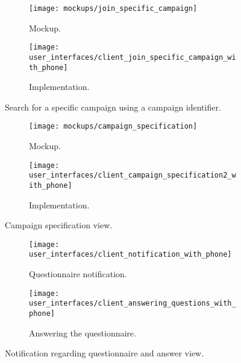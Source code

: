 \begin{figure}
\begin{subfigure}[!t]{.48\textwidth}
  \centering
  \texttt{[image: mockups/join\_specific\_campaign]}
  \caption{Mockup.}
  \label{fig:mockup_specific_campaign}
\end{subfigure}%
\begin{subfigure}[!t]{.52\textwidth}
  \centering
  \texttt{[image: user\_interfaces/client\_join\_specific\_campaign\_with\_phone]}
  \caption{Implementation.}
  \label{fig:implementation_specific_campaign}
\end{subfigure}
\caption{Search for a specific campaign using a campaign identifier.}
\label{fig:specific_campaign}
\end{figure}
\FloatBarrier

\begin{figure}
\begin{subfigure}[!t]{.48\textwidth}
  \centering
  \texttt{[image: mockups/campaign\_specification]}
  \caption{Mockup.}
  \label{fig:mockup_campaign_specification}
\end{subfigure}%
\begin{subfigure}[!t]{.52\textwidth}
  \centering
  \texttt{[image: user\_interfaces/client\_campaign\_specification2\_with\_phone]}
  \caption{Implementation.}
  \label{fig:implementation_campaign_specification}
\end{subfigure}
\caption{Campaign specification view.}
\label{fig:campaign_specification}
\end{figure}
\FloatBarrier

\begin{figure}
\begin{subfigure}[!t]{.50\textwidth}
  \centering
  \texttt{[image: user\_interfaces/client\_notification\_with\_phone]}
  \caption{Questionnaire notification.}
  \label{fig:answering_questionnaire_notification}
\end{subfigure}%
\begin{subfigure}[!t]{.50\textwidth}
  \centering
  \texttt{[image: user\_interfaces/client\_answering\_questions\_with\_phone]}
  \caption{Answering the questionnaire.}
  \label{fig:answering_questionnaire_answering}
\end{subfigure}
\caption{Notification regarding questionnaire and answer view.}
\label{fig:answering_questionnaire}
\end{figure}
\FloatBarrier